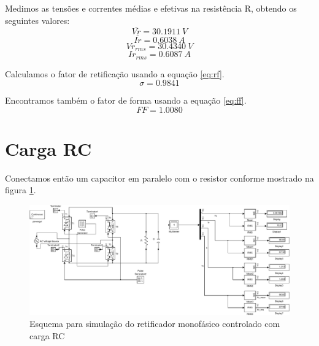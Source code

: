 \documentclass{report}
\begin{document}
Medimos as tensões e correntes médias e efetivas na resistência R, obtendo os seguintes valores:
\begin{equation}
\overline{Vr} = 30.1911\ V
\end{equation}
\begin{equation}
\overline{Ir} =  0.6038\ A
\end{equation}
\begin{equation}
Vr_{rms} =  30.4340\ V
\end{equation}
\begin{equation}
Ir_{rms} =    0.6087\ A
\end{equation}

Calculamos o fator de retificação usando a equação \ref{eq:rf}.
\begin{equation}
\sigma =  0.9841
\end{equation}

Encontramos também o fator de forma usando a equação \ref{eq:ff}.
\begin{equation}
FF = 1.0080
\end{equation}



\section{Carga RC}
Conectamos então um capacitor em paralelo com o resistor conforme mostrado na figura \ref{fig:rcsim}.
\begin{figure}[H]
	\centering
	\includegraphics[width=\linewidth]{matlab/rcsim}
	\caption{Esquema para simulação do retificador monofásico controlado com carga RC}
	\label{fig:rcsim}
\end{figure}
\end{document}
